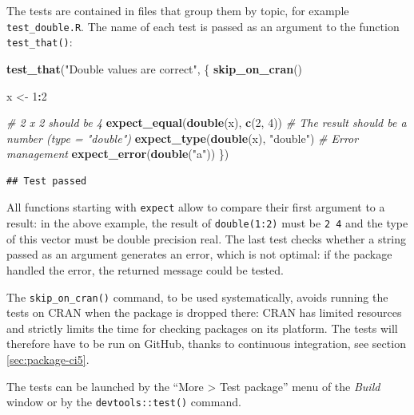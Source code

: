 \documentclass[
  12pt,
  american,
  a4paper,
  extrafontsizes,onecolumn,openright
  ]{memoir}
\newenvironment{Shaded}{\begin{snugshade}}{\end{snugshade}}
\newcommand{\CommentTok}[1]{\textcolor[rgb]{0.56,0.35,0.01}{\textit{#1}}}
\newcommand{\DecValTok}[1]{\textcolor[rgb]{0.00,0.00,0.81}{#1}}
\newcommand{\FunctionTok}[1]{\textcolor[rgb]{0.13,0.29,0.53}{\textbf{#1}}}
\newcommand{\NormalTok}[1]{#1}
\newcommand{\OtherTok}[1]{\textcolor[rgb]{0.56,0.35,0.01}{#1}}
\newcommand{\SpecialCharTok}[1]{\textcolor[rgb]{0.81,0.36,0.00}{\textbf{#1}}}
\newcommand{\StringTok}[1]{\textcolor[rgb]{0.31,0.60,0.02}{#1}}
\begin{document}
\normalsize

The tests are contained in files that group them by topic, for example \texttt{test\_double.R}.
The name of each test is passed as an argument to the function \texttt{test\_that()}:

\scriptsize

\begin{Shaded}
\begin{Highlighting}[]
\FunctionTok{test\_that}\NormalTok{(}\StringTok{"Double values are correct"}\NormalTok{, \{}
  \FunctionTok{skip\_on\_cran}\NormalTok{()}

\NormalTok{  x }\OtherTok{\textless{}{-}} \DecValTok{1}\SpecialCharTok{:}\DecValTok{2}

  \CommentTok{\# 2 x 2 should be 4}
  \FunctionTok{expect\_equal}\NormalTok{(}\FunctionTok{double}\NormalTok{(x), }\FunctionTok{c}\NormalTok{(}\DecValTok{2}\NormalTok{, }\DecValTok{4}\NormalTok{))}
  \CommentTok{\# The result should be a number (type = "double")}
  \FunctionTok{expect\_type}\NormalTok{(}\FunctionTok{double}\NormalTok{(x), }\StringTok{"double"}\NormalTok{)}
  \CommentTok{\# Error management}
  \FunctionTok{expect\_error}\NormalTok{(}\FunctionTok{double}\NormalTok{(}\StringTok{"a"}\NormalTok{))}
\NormalTok{\})}
\end{Highlighting}
\end{Shaded}

\begin{verbatim}
## Test passed
\end{verbatim}

\normalsize

All functions starting with \texttt{expect} allow to compare their first argument to a result: in the above example, the result of \texttt{double(1:2)} must be \texttt{2\ 4} and the type of this vector must be double precision real.
The last test checks whether a string passed as an argument generates an error, which is not optimal: if the package handled the error, the returned message could be tested.

The \texttt{skip\_on\_cran()} command, to be used systematically, avoids running the tests on CRAN when the package is dropped there: CRAN has limited resources and strictly limits the time for checking packages on its platform.
The tests will therefore have to be run on GitHub, thanks to continuous integration, see section \ref{sec:package-ci5}.

The tests can be launched by the \enquote{More \textgreater{} Test package} menu of the \emph{Build} window or by the \texttt{devtools::test()} command.
\end{document}
